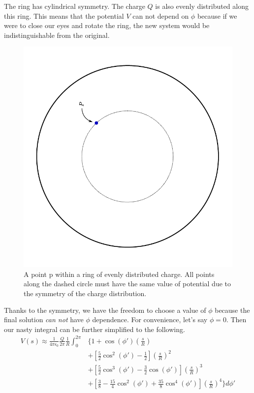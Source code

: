 \documentclass[a4paper, 11pt]{article}
\newenvironment{solution}{%
	\begin{list}{}{%
			\setlength{\topsep}{0pt}%
			\setlength{\leftmargin}{0.5cm}%
			\setlength{\rightmargin}{0.5cm}%
			\setlength{\listparindent}{\parindent}%
			\setlength{\itemindent}{\parindent}%
			\setlength{\parsep}{\parskip}%
		}%
		\item[]}{\end{list}}
\begin{document}
\begin{solution}
  \noindent The ring has cylindrical symmetry. The charge $Q$ is also evenly distributed
  along this ring. This means that the potential $V$ can not depend on $\phi$
  because if we were to close our eyes and rotate the ring, the new system would
  be indistinguishable from the original.
  \begin{figure}[!hbt]
    \centering
    \includegraphics[width=0.7\columnwidth, angle=-90]{ring_symmetry}
    \caption{A point p within a ring of evenly distributed charge. All points
      along the dashed circle must have the same value of potential due to the
      symmetry of the charge distribution.}
  \end{figure}


  \noindent Thanks to the symmetry, we have the freedom to choose a value of $\phi$
  because the final solution \textit{can not} have $\phi$ dependence. For convenience,
  let's say $\phi=0$. Then our nasty integral can be further simplified to the
  following.  
 \begin{equation}
    \begin{split}
      V(s)\approx\frac{1}{4\pi\epsilon_0}\frac{Q}{2\pi}\frac{1}{R}\int_0^{2\pi}&\Bigg\{ 1+\cos(\phi')\left( \frac{s}{R} \right)\\
      &+ \left[ \frac{5}{2}\cos^2(\phi')-\frac{1}{2}  \right]\left( \frac{s}{R} \right)^2\\
      &+ \left[ \frac{5}{2}\cos^3(\phi')-\frac{3}{2}\cos(\phi')    \right]\left( \frac{s}{R} \right)^3\\
      &+ \left[ \frac{3}{8}-\frac{15}{4}\cos^2(\phi')+\frac{35}{8}\cos^4(\phi') \right]\left( \frac{s}{R} \right)^4  \Bigg\}d\phi'
    \end{split}
  \end{equation}


\end{solution}
\end{document}
